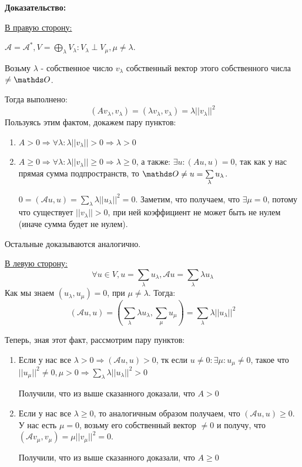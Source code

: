 \textbf{Доказательство:}

\uline{В правую сторону:}

$ \mathcal{A} = \mathcal{A}^*, V = \bigoplus\limits_{\lambda} V_\lambda: V_\lambda \perp V_\mu, \mu \neq \lambda$.

Возьму $\lambda$ - собственное число $v_\lambda$ собственный вектор этого собственного числа $\neq \zero$.

Тогда выполнено: $$(Av_\lambda, v_\lambda) = (\lambda v_\lambda, v_\lambda) = \lambda ||v_\lambda||^2$$
Пользуясь этим фактом, докажем пару пунктов:

\begin{enumerate}
    \item $A >0 \Rightarrow \forall \lambda : \lambda ||v_\lambda|| >0 \Rightarrow \lambda >0$
    \item $A \geq  0 \Rightarrow \forall \lambda: \lambda ||v_\lambda|| \geq 0 \Rightarrow \lambda \geq 0$, а также:
    $\exists u: (Au,u) = 0$, так как у нас прямая сумма подпространств, то $\zero \neq u = \sum\limits_\lambda u_\lambda$. 

    $0=(\mathcal{A}u,u) = \sum\limits_\lambda \lambda||u_\lambda||^2 =0$. Заметим, что получаем, что $\exists \mu = 0$, потому что существует $||v_\lambda|| > 0 $, при ней коэффициент не может быть не нулем (иначе сумма будет не нулем).
\end{enumerate}
Остальные доказываются аналогично.

\uline{В левую сторону:}
$$\forall u \in V, u =\sum\limits_{\lambda}  u_\lambda, \mathcal{A}u = \sum\limits_{\lambda} \lambda u_\lambda$$
Как мы знаем $(u_\lambda, u_\mu ) = 0$, при $ \mu \neq \lambda$. Тогда: $$(\mathcal{A}u,u) = (\sum\limits_{\lambda}\lambda u_\lambda, \sum\limits_\mu u_\mu)  = \sum\limits_{\lambda}\lambda ||u_\lambda||^2 $$

Теперь, зная этот факт, рассмотрим пару пунктов:

\begin{enumerate}
    \item Если у нас все $\lambda > 0 \Rightarrow (\mathcal{A}u,u) > 0$, тк если $u \neq 0 : \exists \mu: u_\mu \neq 0$, такое что $||u_\mu||^2 \neq 0, \mu >0 \Rightarrow \sum\limits_{\lambda}\lambda||u_\lambda||^2 > 0$
    
    Получили, что из выше сказанного доказали, что $A > 0$

    \item Если у нас все $\lambda \geq 0$, то аналогичным образом получаем, что $ (\mathcal{A}u,u) \geq 0$. У нас есть $\mu = 0$, возьму его собственный вектор $\neq 0$ и получу, что $(\mathcal{A} v_\mu,v_\mu) = \mu ||v_\mu||^2 = 0$.

     Получили, что из выше сказанного доказали, что $A \geq 0$
\end{enumerate}

